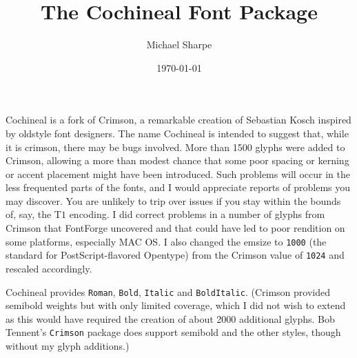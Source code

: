 \documentclass[11pt]{article}
\title{The Cochineal Font Package}
\author{Michael Sharpe}
\date{\today}  %
\begin{document}
\maketitle
Cochineal is a fork of Crimson, a remarkable creation of Sebastian Kosch inspired by oldstyle font designers. The name Cochineal is intended to suggest that, while it is crimson, there may be bugs involved. More than 1500 glyphs were added to Crimson, allowing a more than modest chance that some poor spacing or kerning or accent placement might have been introduced. Such problems will occur in the less frequented parts of the fonts, and I would appreciate reports of problems you may discover. You are unlikely to trip over issues if you stay within the bounds of, say, the T$1$ encoding. I did correct problems in a number of glyphs from Crimson that FontForge uncovered and that could have led to poor rendition on some platforms, especially MAC OS. I also changed the emsize to {\tt 1000} (the standard for PostScript-flavored Opentype) from the Crimson value of {\tt  1024} and rescaled accordingly.

Cochineal provides {\tt Roman}, {\tt Bold}, {\tt Italic} and {\tt BoldItalic}. (Crimson provided semibold weights but with only limited coverage, which I did not wish to extend as this would have required the creation of about 2000 additional glyphs. Bob Tennent's {\tt Crimson} package does support semibold and the other styles, though  without my glyph additions.)
\end{document}

